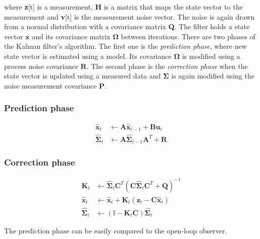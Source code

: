where \textbf{z}[t] is a measurement, \textbf{H} is a matrix that maps the state vector to the measurement and \textbf{v}[t] is the measurement noise vector. The noise is again drawn from a normal distribution with a covariance matrix \textbf{Q}. The filter holds a state vector $\textbf{\^x}$ and its covariance matrix $\boldsymbol{\Omega}$ between iterations. There are two phases of the Kalman filter's algorithm. The first one is the \textit{prediction phase}, where new state vector is estimated using a model. Its covariance $\boldsymbol{\Omega}$ is modified using a process noise covariance $\textbf{R}$. The second phase is the \textit{correction phase} when the state vector is updated using a measured data and $\boldsymbol{\Sigma}$ is again modified using the noise measurement covariance \textbf{P}.      

\subsubsection*{Prediction phase}

\begin{equation}
\begin{split}
\hat{\textbf{x}}_t &\leftarrow \textbf{A}\hat{\textbf{x}}_{t-1} + \textbf{B}\textbf{u}_t \\
\hat{\boldsymbol{\Sigma}}_t &\leftarrow \textbf{A}\hat{\boldsymbol{\Sigma}}_{t-1}\textbf{A}^{T} + \textbf{R}
\end{split}
\end{equation}

\subsubsection*{Correction phase}

\begin{equation}
\begin{split}
\textbf{K}_t &\leftarrow \hat{\boldsymbol{\Sigma}}_t\textbf{C}^{T}\left(\textbf{C}\hat{\boldsymbol{\Sigma}}_t\textbf{C}^{T} + \textbf{Q}\right)^{-1} \\
\hat{\textbf{x}}_t &\leftarrow \hat{\textbf{x}}_t + \textbf{K}_t\left(\textbf{z}_t - \textbf{C}\hat{\textbf{x}}_t\right) \\
\hat{\boldsymbol{\Sigma}}_t &\leftarrow \left(\mathbb{I} - \textbf{K}_t\textbf{C}\right)\hat{\boldsymbol{\Sigma}}_t
\end{split}
\end{equation}

The prediction phase can be easily compared to the open-loop observer. 